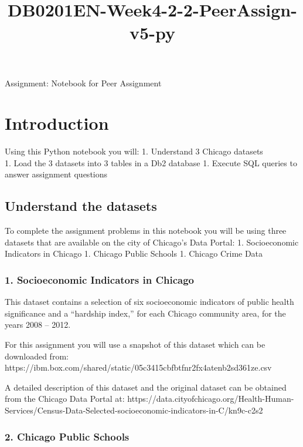 \documentclass[11pt]{article}
\title{DB0201EN-Week4-2-2-PeerAssign-v5-py}
\begin{document}
    
    \maketitle
    
    

    
    Assignment: Notebook for Peer Assignment

    \hypertarget{introduction}{%
\section{Introduction}\label{introduction}}

Using this Python notebook you will: 1. Understand 3 Chicago datasets\\
1. Load the 3 datasets into 3 tables in a Db2 database 1. Execute SQL
queries to answer assignment questions

    \hypertarget{understand-the-datasets}{%
\subsection{Understand the datasets}\label{understand-the-datasets}}

To complete the assignment problems in this notebook you will be using
three datasets that are available on the city of Chicago's Data Portal:
1. Socioeconomic Indicators in Chicago 1. Chicago Public Schools 1.
Chicago Crime Data

\hypertarget{socioeconomic-indicators-in-chicago}{%
\subsubsection{1. Socioeconomic Indicators in
Chicago}\label{socioeconomic-indicators-in-chicago}}

This dataset contains a selection of six socioeconomic indicators of
public health significance and a ``hardship index,'' for each Chicago
community area, for the years 2008 -- 2012.

For this assignment you will use a snapshot of this dataset which can be
downloaded from:
https://ibm.box.com/shared/static/05c3415cbfbtfnr2fx4atenb2sd361ze.csv

A detailed description of this dataset and the original dataset can be
obtained from the Chicago Data Portal at:
https://data.cityofchicago.org/Health-Human-Services/Census-Data-Selected-socioeconomic-indicators-in-C/kn9c-c2s2

\hypertarget{chicago-public-schools}{%
\subsubsection{2. Chicago Public Schools}\label{chicago-public-schools}}
\end{document}
